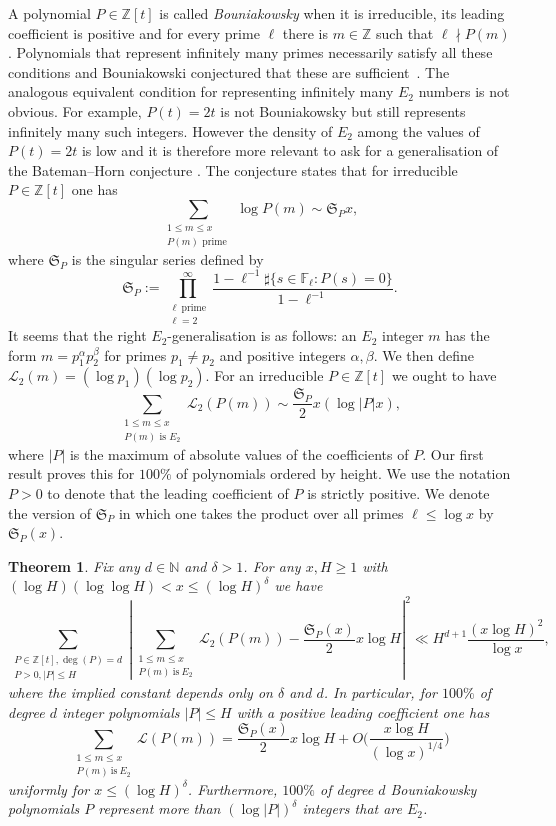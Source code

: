 \documentclass[reqno, 11pt]{amsart}
\numberwithin{equation}{section}
\newtheorem{theorem}{Theorem}[section]
\theoremstyle{definition}
\newcommand{\0}{\mathbf{0}}
\renewcommand{\leq}{\leqslant}
\renewcommand{\geq}{\geqslant}
\renewcommand{\P}{\mathbb{P}}
\newcommand{\Z}{\mathbb{Z}}
\renewcommand{\leq}{\leqslant}
\renewcommand{\geq}{\geqslant}
\renewcommand{\#}{\sharp}
\begin{document}
A polynomial $P\in \mathbb{Z}[t]$ is  called \textit{Bouniakowsky} when  it is irreducible,
its leading coefficient is positive and for every prime $\ell$ there is $m\in \mathbb Z$ such that 
$\ell\nmid P(m)$. Polynomials that represent infinitely  many primes  necessarily satisfy all these conditions
and Bouniakowski  conjectured  that these are sufficient~\cite[page 328]{boun}. 
The analogous equivalent condition   for representing infinitely many $E_2$ numbers is not obvious. For example,
$P(t)=2t$ is not Bouniakowsky but still represents infinitely many such integers. However the density  
of $E_2$ among the values of $P(t)=2t$ is low and it is therefore more relevant to ask for a generalisation of the Bateman--Horn 
conjecture \cite{MR148632}. The conjecture states that for irreducible $P\in \Z[t]$ one has $$
\sum_{\substack{1\leq m\leq x\\P(m) \textrm{ prime } } }
\log P(m)
\sim \mathfrak S_{ P}x, $$ where   $ \mathfrak S_{P}$ is the singular series defined by 
$$  \mathfrak S_{P}:=\prod_{\substack{ \ell \ \mathrm{ prime}\\ \ell=2 }}^\infty 
\frac{1-\ell^{-1} \#\{s\in \mathbb F_\ell:P(s)=0\}}{1-\ell^{-1}}.$$ It seems that the right $E_2$-generalisation is as follows:  
an $E_2$ integer $m$ has the form $m=p_1^{\alpha} p_2^{\beta}$ for primes $p_1 \neq p_2$ and positive integers $\alpha,\beta$. 
We then define   $\mathcal L_2(m)= (\log p_1)(\log p_2)$.  For an irreducible $P\in \mathbb Z[t]$ we ought to have 
$$ \sum_{\substack{1\leq m\leq x\\P(m) \textrm{ is } E_2 } }
\mathcal L_2(P(m))
\sim \frac{\mathfrak S_{ P}}{2} x (\log |P|x), $$ where $
|P|$ is the  maximum of absolute values of the 
coefficients of $P$.
Our first result proves this  for $100\%$ of polynomials ordered by height. We use the notation
$P>0$ to denote    that the leading coefficient of $P$ is strictly positive. We denote the version of $ \mathfrak S_{P}$ in which one takes the product over all primes $\ell \leq \log x $ by $ \mathfrak S_{P}(x)$.
\begin{theorem}
\label{thm:bounia2}  Fix any $d\in \mathbb N$ and $\delta>1$. For any $x,H\geq 1$ with 
$ (\log H)(\log \log H)<x \leq (\log H)^\delta$ we have  $$ \sum_{\substack{ P\in \Z[t], \deg(P)=d \\ P>0, |P|\leq H}}
\left|\sum_{\substack{1\leq m\leq x\\P(m) \ \mathrm{ is } \ E_2 } }\mathcal L_2(P(m))
-\frac{\mathfrak S_{ P}(x)}{2} x \log H\right|^2 \ll H^{d+1} \frac{(x\log H)^2}{\log x},$$ where the implied constant depends only on $\delta$ and $d$. In particular, for $100\%$ of degree $d$ integer polynomials $|P|\leq H$ with a positive leading coefficient 
one has   $$\sum_{\substack{1\leq m\leq x\\P(m) \ \mathrm{ is }\  E_2 } }\mathcal L(P(m))
=\frac{\mathfrak S_{ P}(x)}{2} x \log H+O\Bigg(
 \frac{x\log H}{(\log x)^{1/4}} \Bigg)$$ uniformly for  $x\leq (\log H)^\delta$. Furthermore, $100\%$ of degree $d$ Bouniakowsky polynomials $P$ represent more than   $(\log |P|)^\delta$ integers that are $E_2$. \end{theorem} 
\end{document}
